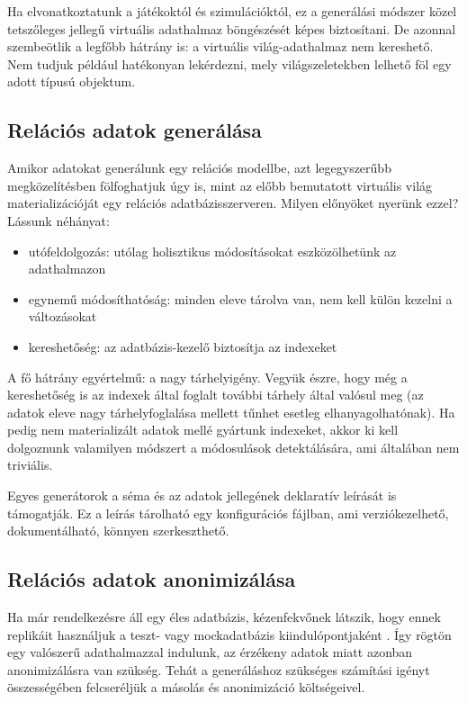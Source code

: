 \documentclass[
    parspace,
    noindent,
    nohyp,
]{elteiktdk}[2023/04/10]
\newcommand{\todoref}[1]{\todo[inline, noinlinepar, color=red, textcolor=white, inlinewidth=0.6cm, caption={#1}]{\large \textbf{×}}}
\begin{document}
Ha elvonatkoztatunk a játékoktól és szimulációktól,
ez a generálási módszer közel tetszőleges jellegű virtuális adathalmaz böngészését képes biztosítani.
De azonnal szembeötlik a legfőbb hátrány is: a virtuális világ-adathalmaz nem kereshető.
Nem tudjuk például hatékonyan lekérdezni, mely világszeletekben lelhető föl egy adott típusú objektum.

\subsection{Relációs adatok generálása}

Amikor adatokat generálunk egy relációs modellbe, azt legegyszerűbb megközelítésben fölfoghatjuk úgy is,
mint az előbb bemutatott virtuális világ materializációját egy relációs adatbázisszerveren.
Milyen előnyöket nyerünk ezzel? Lássunk néhányat:

\begin{itemize}
    \item utófeldolgozás: utólag holisztikus módosításokat eszközölhetünk az adathalmazon
    \item egynemű módosíthatóság: minden eleve tárolva van, nem kell külön kezelni a változásokat
    \item kereshetőség: az adatbázis-kezelő biztosítja az indexeket
\end{itemize}

A fő hátrány egyértelmű: a nagy tárhelyigény.
Vegyük észre, hogy még a kereshetőség is az indexek által foglalt további tárhely által valósul meg
(az adatok eleve nagy tárhelyfoglalása mellett tűnhet esetleg elhanyagolhatónak).
Ha pedig nem materializált adatok mellé gyártunk indexeket,
akkor ki kell dolgoznunk valamilyen módszert a módosulások detektálására, ami általában nem triviális.

Egyes generátorok a séma és az adatok jellegének deklaratív leírását is támogatják. Ez a leírás tárolható egy konfigurációs fájlban, ami verziókezelhető, dokumentálható, könnyen szerkeszthető.
\todoref{+CITE: DB deklaratív adatgenerátorok}

\subsection{Relációs adatok anonimizálása}

Ha már rendelkezésre áll egy éles adatbázis, kézenfekvőnek látszik,
hogy ennek replikáit használjuk a teszt- vagy mockadatbázis kiindulópontjaként \todoref{+CITE: DB-anonimizálók}.
Így rögtön egy valószerű adathalmazzal indulunk,
az érzékeny adatok miatt azonban anonimizálásra van szükség.
Tehát a generáláshoz szükséges számítási igényt összességében
felcseréljük a másolás és anonimizáció költségeivel.
\end{document}
